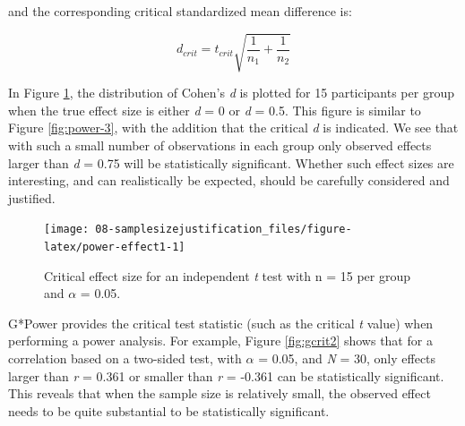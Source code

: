 \documentclass[
  oneside]{krantz}
\begin{document}
and the corresponding critical standardized mean difference is:

\[d_{crit} = t_{crit}{\sqrt{\frac{1}{n_1} + \frac{1}{n_2}}}\]

In Figure \ref{fig:power-effect1}, the distribution of Cohen's \emph{d} is plotted for 15 participants per group when the true effect size is either \emph{d} = 0 or \emph{d} = 0.5. This figure is similar to Figure \ref{fig:power-3}, with the addition that the critical \emph{d} is indicated. We see that with such a small number of observations in each group only observed effects larger than \emph{d} = 0.75 will be statistically significant. Whether such effect sizes are interesting, and can realistically be expected, should be carefully considered and justified.



\begin{figure}

{\centering \texttt{[image: 08-samplesizejustification\_files/figure-latex/power-effect1-1]} 

}

\caption{Critical effect size for an independent \emph{t} test with n = 15 per group and \(\alpha\) = 0.05.}\label{fig:power-effect1}
\end{figure}

G*Power provides the critical test statistic (such as the critical \emph{t} value) when performing a power analysis. For example, Figure \ref{fig:gcrit2} shows that for a correlation based on a two-sided test, with \(\alpha\) = 0.05, and \emph{N} = 30, only effects larger than \emph{r} = 0.361 or smaller than \emph{r} = -0.361 can be statistically significant. This reveals that when the sample size is relatively small, the observed effect needs to be quite substantial to be statistically significant.
\end{document}
